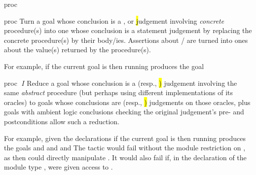 \begin{tactic}{proc}
  \begin{tsyntax}{proc}
    Turn a goal whose conclusion is a \prhl, \phl or \hl judgement
    involving \emph{concrete} procedure(s) into one whose conclusion
    is a statement judgement by replacing the concrete procedure(s) by
    their body/ies. Assertions about / are turned
    into ones about the value(s) returned by the procedure(s).

  \bigskip
  For example, if the current goal is
   then
  running 
  produces the goal
  \end{tsyntax}

  \begin{tsyntax}{proc $\;I$}
    Reduce a goal whose conclusion is a \prhl (resp., \hl) judgement
    involving the same \emph{abstract} procedure (but perhaps using
    different implementations of its oracles) to goals whose
    conclusions are \prhl (resp., \hl) judgements on those oracles,
    plus goals with ambient logic conclusions checking the original
    judgement's pre- and postconditions allow such a reduction.

  \bigskip
  For example, given the declarations
  if the current goal is
   then
  running 
  produces the goals
  and
  and
  and
  The tactic would fail without the module restriction  on
  , as then  could directly manipulate .
  It would also fail if, in the declaration of the module type ,
   were given access to .
  \end{tsyntax}


\end{tactic}
